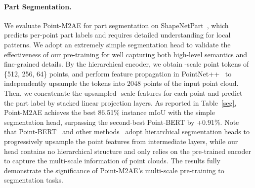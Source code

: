 \documentclass{article}
\begin{document}
\paragraph{Part Segmentation.}
We evaluate Point-M2AE for part segmentation on ShapeNetPart~\cite{shapenetpart}, which predicts per-point part labels and requires detailed understanding for local patterns. We adopt an extremely simple segmentation head to validate the effectiveness of our pre-training for well capturing both high-level semantics and fine-grained details. By the hierarchical encoder, we obtain -scale point tokens of \{512, 256, 64\} points, and perform feature propagation in PointNet++~\cite{qi2017pointnet++} to independently upsample the tokens into 2048 points of the input point cloud. Then, we concatenate the upsampled -scale features for each point and predict the part label by stacked linear projection layers. As reported in Table~\ref{seg}, Point-M2AE achieves the best 86.51\% instance mIoU with the simple segmentation head, surpassing the second-best Point-BERT by +0.91\%. Note that Point-BERT~\cite{pointbert} and other methods~\cite{qi2017pointnet,qi2017pointnet++,dgcnn} adopt hierarchical segmentation heads to progressively upsample the point features from intermediate layers, while our head contains no hierarchical structure and only relies on the pre-trained encoder to capture the multi-scale information of point clouds. The results fully demonstrate the significance of Point-M2AE's multi-scale pre-training to segmentation tasks.
\end{document}
